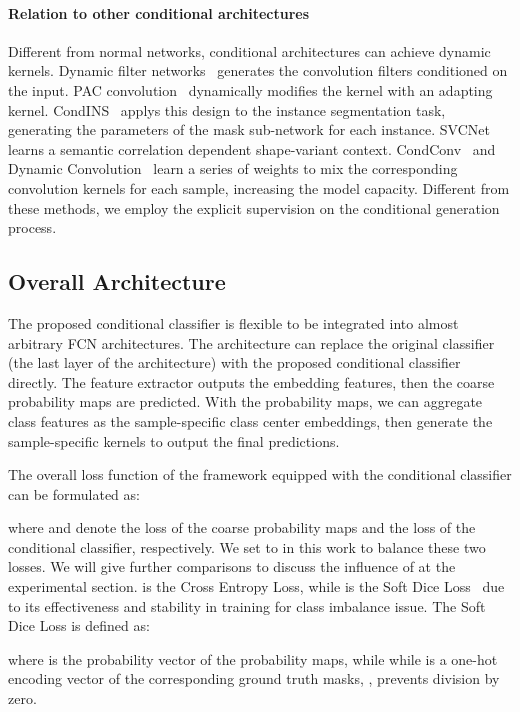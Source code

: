 \documentclass[journal]{IEEEtran}
\begin{document}
\paragraph{Relation to other conditional architectures}
Different from normal networks,
conditional architectures can achieve 
dynamic kernels.
Dynamic filter networks~\cite{Xu-NIPS-DFN-2016} 
generates the convolution filters 
conditioned on the input.
PAC convolution~\cite{Su-CVPR-PAC-2019}
dynamically modifies the kernel with
an adapting kernel.
CondINS~\cite{Tian-ECCV-CondINS-2020} applys this design to the instance segmentation task,
generating the parameters of the mask sub-network
for each instance.
SVCNet\cite{Ding-CVPR-SVCNet-2019} 
learns a semantic correlation
dependent shape-variant context.
CondConv~\cite{Yang-NIPS-CondConv-2019} and Dynamic Convolution~\cite{Chen-CVPR-DynamicConv-2020}
learn a series of weights 
to mix the corresponding convolution kernels 
for each sample, increasing the model capacity.
Different from these methods,
we employ the explicit supervision 
on the
conditional generation process.

\subsection{Overall Architecture}
The proposed conditional classifier is flexible
to be integrated into almost arbitrary FCN architectures.
The architecture can replace the original classifier 
(the last layer of the architecture)
with the proposed conditional classifier directly.
The feature extractor outputs the embedding features,
then the coarse probability maps are predicted.
With the probability maps,
we can aggregate class features as the sample-specific class center embeddings,
then generate the sample-specific kernels 
to output the final predictions.

The overall loss function of the framework equipped with 
the conditional classifier can be formulated as:

where  and  denote
the loss of the coarse probability maps
and the loss of the conditional classifier, respectively.
We set  to  in this work to balance these two losses.
We will give further comparisons
to discuss the influence of 
at the experimental section.
 is the Cross Entropy Loss, 
while  is the Soft Dice Loss~\cite{Milletari-3DV-VNet-2016}
due to its effectiveness and stability in training
for class imbalance issue.
The Soft Dice Loss is defined as:

where  is the probability vector of the probability maps, 
while while  is a one-hot encoding vector of the corresponding ground truth masks, ,  prevents division by zero.
\end{document}
